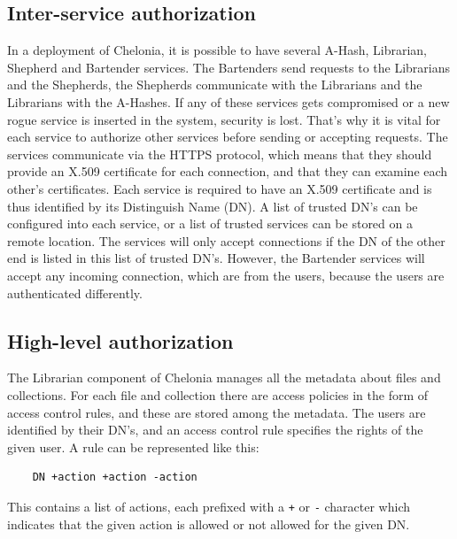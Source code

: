 \documentclass{book}
\begin{document}
\subsection{Inter-service authorization} %
\label{sub:inter_service_authorization}

In a deployment of Chelonia, it is possible to have several A-Hash, Librarian, Shepherd and Bartender services. The Bartenders send requests to the Librarians and the Shepherds, the Shepherds communicate with the Librarians and the Librarians with the A-Hashes. If any of these services gets compromised or a new rogue service is inserted in the system, security is lost. That's why it is vital for each service to authorize other services before sending or accepting requests. The services communicate via the HTTPS protocol, which means that they should provide an X.509 certificate for each connection, and that they can examine each other's certificates. Each service is required to have an X.509 certificate and is thus identified by its Distinguish Name (DN). A list of trusted DN's can be configured into each service, or a list of trusted services can be stored on a remote location. The services will only accept connections if the DN of the other end is listed in this list of trusted DN's. However, the Bartender services will accept any incoming connection, which are from the users, because the users are authenticated differently.


\subsection{High-level authorization} %
\label{sub:high_level_authorization}

The Librarian component of Chelonia manages all the metadata about files and collections. For each file and collection there are access policies in the form of access control rules, and these are stored among the metadata. The users are identified by their DN's, and an access control rule specifies the rights of the given user. A rule can be represented like this:

\begin{verbatim}
    DN +action +action -action
\end{verbatim}

This contains a list of actions, each prefixed with a \verb!+! or \verb!-! character which indicates that the given action is allowed or not allowed for the given DN.
\end{document}

